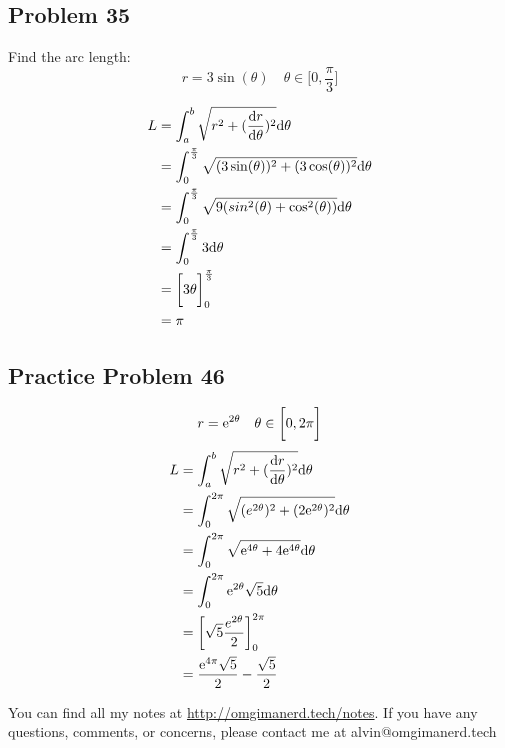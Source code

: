 \documentclass[letterpaper, 12pt]{math}
\begin{document}
\subsection*{Problem 35}
Find the arc length:
\[ r = 3\sin(\theta) \quad \theta\in\bigg[0,\frac{\pi}{3}\bigg] \]
\begin{center}
\end{center}
\begin{align*}
  L &= \int_{a}^{b}{\sqrt{r^{2}+(\frac{\mathrm{d}{r}}{\mathrm{d}{\theta}})^{2}}\mathrm{d}{\theta}} \\
  &= \int_{0}^{\frac{\pi}{3}}
    {\sqrt{(3\sin(\theta))^{2}+(3\cos(\theta))^{2}}\mathrm{d}{\theta}} \\
  &= \int_{0}^{\frac{\pi}{3}}
    {\sqrt{9(sin^{2}(\theta)+\cos^{2}(\theta))}\mathrm{d}{\theta}} \\
  &= \int_{0}^{\frac{\pi}{3}}{3\mathrm{d}{\theta}} \\
  &= \bigg[3\theta\bigg]_{0}^{\frac{\pi}{3}} \\
  &= \pi
\end{align*}

\subsection*{Practice Problem 46}
\[ r = \mathrm{e}^{2\theta} \quad \theta\in\bigg[0,2\pi\bigg] \]
\begin{align*}
  L &= \int_{a}^{b}{\sqrt{r^{2}+(\frac{\mathrm{d}{r}}{\mathrm{d}{\theta}})^{2}}\mathrm{d}{\theta}} \\
  &= \int_{0}^{2\pi}
    {\sqrt{(e^{2\theta})^{2}+(2\mathrm{e}^{2\theta})^{2}}\mathrm{d}{\theta}} \\
  &= \int_{0}^{2\pi}{\sqrt{\mathrm{e}^{4\theta}+4\mathrm{e}^{4\theta}}\mathrm{d}{\theta}} \\
  &= \int_{0}^{2\pi}{\mathrm{e}^{2\theta}\sqrt{5}\mathrm{d}{\theta}} \\
  &= \bigg[\sqrt{5}\frac{e^{2\theta}}{2}\bigg]_{0}^{2\pi} \\
  &= \frac{\mathrm{e}^{4\pi}\sqrt{5}}{2}-\frac{\sqrt{5}}{2}
\end{align*}

\begin{center}
  You can find all my notes at \url{http://omgimanerd.tech/notes}. If you have
  any questions, comments, or concerns, please contact me at
  alvin@omgimanerd.tech
\end{center}
\end{document}
